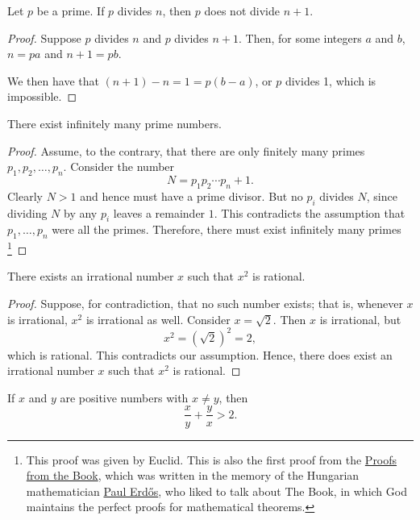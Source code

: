 \begin{theorem}
Let $p$ be a prime. If $p$ divides $n$, then $p$ does not divide $n+1$. 
\end{theorem}
\begin{proof}
Suppose $p$ divides $n$ and $p$ divides $n+1$. Then, for some integers $a$ and $b$, $n = pa$ and $n+1 = pb$. 

We then have that $(n+1) - n = 1 = p(b-a)$, or $p$ divides 1, which is impossible.
\end{proof}

\begin{theorem}
There exist infinitely many prime numbers.
\label{thm:infiniteprimes}
\end{theorem}

\begin{proof}

Assume, to the contrary, that there are only finitely many primes 
$p_1, p_2, \dots, p_n$. Consider the number
\[
N = p_1 p_2 \cdots p_n + 1.
\]
Clearly $N > 1$ and hence must have a prime divisor. But no $p_i$ divides $N$, 
since dividing $N$ by any $p_i$ leaves a remainder $1$. This contradicts the 
assumption that $p_1, \dots, p_n$ were all the primes. Therefore, there must 
exist infinitely many primes \footnote{This proof was given by Euclid. This is also the first proof from the \href{https://en.wikipedia.org/wiki/Proofs\_from\_THE\_BOOK}{Proofs from the Book}, which was written in the memory of the Hungarian mathematician \href{https://archive.nytimes.com/www.nytimes.com/books/first/h/hoffman-man.html}{Paul Erd\H{o}s}, who  liked to talk about The Book, in which God maintains the perfect proofs for mathematical theorems.}
\end{proof}

\begin{theorem}
There exists an irrational number $x$ such that $x^2$ is rational.
\label{thm:irrational}
\end{theorem}

\begin{proof}
Suppose, for contradiction, that no such number exists; that is, 
whenever $x$ is irrational, $x^2$ is irrational as well. Consider $x = \sqrt{2}$. 
Then $x$ is irrational, but
\[
x^2 = (\sqrt{2})^2 = 2,
\]
which is rational. This contradicts our assumption. Hence, there does exist 
an irrational number $x$ such that $x^2$ is rational.
\end{proof}

\begin{theorem}
\label{thm:contradictionisbetter}
If $x$ and $y$ are positive numbers with $x \neq y$, then
\[
\frac{x}{y} + \frac{y}{x} > 2.
\]
\end{theorem}


